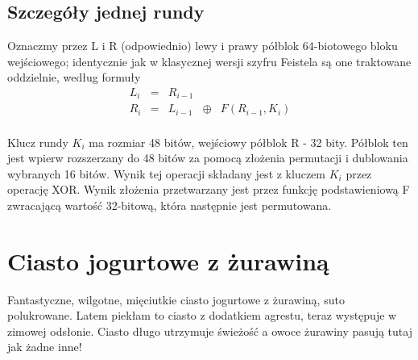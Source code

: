 \documentclass[12pt, a4paper,titlepage]{article}
\begin{document}
\subsection{Szczegóły jednej rundy}
Oznaczmy przez L i R (odpowiednio) lewy i prawy półblok 64-biotowego bloku wejściowego; identycznie jak w klasycznej wersji szyfru Feistela są one traktowane oddzielnie, według formuły
\\
$$\begin{array}{ccccc}
L_{i} & = & R_{i-1} & & \\
R_{i} & = & L_{i-1} & \oplus & F(R_{i-1}, K_{i})\\
\end{array}$$


\justify Klucz rundy $K_i$ ma rozmiar 48 bitów, wejściowy półblok R - 32 bity. Półblok ten jest wpierw
rozszerzany do 48 bitów za pomocą złożenia permutacji i dublowania wybranych 16 bitów.
Wynik tej operacji składany jest z kluczem $K_i$ przez operację XOR. Wynik złożenia przetwarzany jest przez funkcję podstawieniową F zwracającą wartość 32-bitową, która następnie
jest permutowana.
\newpage
\section{Ciasto jogurtowe z żurawiną}
Fantastyczne, wilgotne, mięciutkie ciasto jogurtowe z żurawiną, suto polukrowane. Latem
piekłam to ciasto z dodatkiem agrestu, teraz występuje w zimowej odsłonie. Ciasto długo
utrzymuje świeżość a owoce żurawiny pasują tutaj jak żadne inne! \cite{latexdpps}
\end{document}
